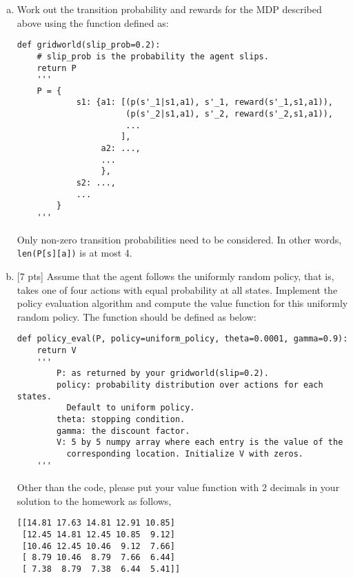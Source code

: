 \begin{enumerate}[(a)]
    \item Work out the transition probability and rewards for the MDP described
    above using the function defined as:
    \begin{verbatim}
def gridworld(slip_prob=0.2):
    # slip_prob is the probability the agent slips.
    return P
    '''
    P = {
            s1: {a1: [(p(s'_1|s1,a1), s'_1, reward(s'_1,s1,a1)),
                      (p(s'_2|s1,a1), s'_2, reward(s'_2,s1,a1)),
                      ...
                     ],
                 a2: ...,
                 ...
                 },
            s2: ...,
            ...
        }
    '''
    \end{verbatim}
    Only non-zero transition probabilities need to be considered. In other
    words, \texttt{len(P[s][a])} is at most 4.

    \item{}[7 pts] Assume that the agent follows the uniformly random policy, that is,
    takes one of four actions with equal probability at all states.
    Implement the policy evaluation algorithm and compute the value
    function for this uniformly random policy.
    The function should be defined as below:
    \begin{verbatim}
def policy_eval(P, policy=uniform_policy, theta=0.0001, gamma=0.9):
    return V
    '''
        P: as returned by your gridworld(slip=0.2).
        policy: probability distribution over actions for each states.
          Default to uniform policy.
        theta: stopping condition.
        gamma: the discount factor.
        V: 5 by 5 numpy array where each entry is the value of the
          corresponding location. Initialize V with zeros.
    '''
    \end{verbatim}
    Other than the code, please put your value function with 2 decimals
    in your solution to the homework as follows,
    \begin{verbatim}
[[14.81 17.63 14.81 12.91 10.85]
 [12.45 14.81 12.45 10.85  9.12]
 [10.46 12.45 10.46  9.12  7.66]
 [ 8.79 10.46  8.79  7.66  6.44]
 [ 7.38  8.79  7.38  6.44  5.41]]
    \end{verbatim}


\end{enumerate}
